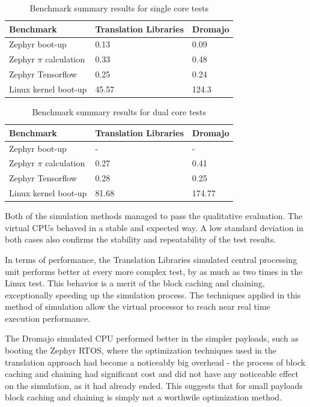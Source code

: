 \begin{table}[h]
    \centering
    \begin{tabular}{l|l|l}
    Benchmark             & Translation Libraries & Dromajo  \\ \hline
    Zephyr boot-up        & 0.13                  & 0.09     \\ \hline
    Zephyr $\pi$ calculation & 0.33               & 0.48     \\ \hline
    Zephyr Tensorflow     & 0.25                  & 0.24     \\ \hline
    Linux kernel boot-up  & 45.57                 & 124.3
    \end{tabular}
    \caption{Benchmark summary results for single core tests}
\end{table}

\begin{table}[h]
    \centering
    \begin{tabular}{l|l|l}
    Benchmark             & Translation Libraries & Dromajo  \\ \hline
    Zephyr boot-up        & -                     & -        \\ \hline
    Zephyr $\pi$ calculation & 0.27               & 0.41     \\ \hline
    Zephyr Tensorflow     & 0.28                  & 0.25     \\ \hline
    Linux kernel boot-up  & 81.68                 & 174.77
    \end{tabular}
    \caption{Benchmark summary results for dual core tests}
\end{table}

\noindent
Both of the simulation methods managed to pass the qualitative evaluation. The virtual CPUs behaved in a stable
and expected way. A low standard deviation in both cases also confirms the stability and repeatability of the test
results.

In terms of performance, the Translation Libraries simulated central processing unit performs better at every more
complex test, by as much as two times in the Linux test. This behavior is a merit of the block caching and chaining,
exceptionally speeding up the simulation process. The techniques applied in this method of simulation allow the virtual
processor to reach near real time execution performance.

The Dromajo simulated CPU performed better in the simpler payloads, such as booting the Zephyr RTOS, where the
optimization techniques used in the translation approach had become a noticeably big overhead - the process of
block caching and chaining had significant cost and did not have any noticeable effect on the simulation, as it had
already ended. This suggests that for small payloads block caching and chaining is simply not a worthwile optimization
method.
